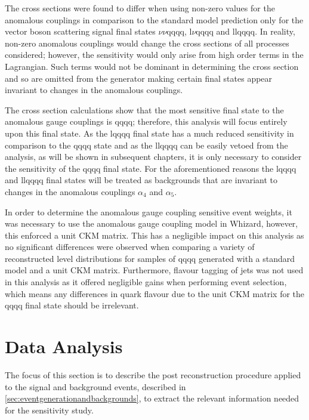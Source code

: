 The cross sections were found to differ when using non-zero values for the anomalous couplings in comparison to the standard model prediction only for the vector boson scattering signal final states $\nu\nu\text{qqqq}$, $\text{l}\nu\text{qqqq}$ and llqqqq.  In reality, non-zero anomalous couplings would change the cross sections of all processes considered; however, the sensitivity would only arise from high order terms in the Lagrangian.  Such terms would not be dominant in determining the cross section and so are omitted from the generator making certain final states appear invariant to changes in the anomalous couplings.

The cross section calculations show that the most sensitive final state to the anomalous gauge couplings is \nu{\nu}qqqq; therefore, this analysis will focus entirely upon this final state.  As the l{\nu}qqqq final state has a much reduced sensitivity in comparison to the \nu{\nu}qqqq state and as the llqqqq can be easily vetoed from the analysis, as will be shown in subsequent chapters, it is only necessary to consider the sensitivity of the \nu{\nu}qqqq final state.  For the aforementioned reasons the l{\nu}qqqq and llqqqq final states will be treated as backgrounds that are invariant to changes in the anomalous couplings $\alpha_{4}$ and $\alpha_{5}$.  

In order to determine the anomalous gauge coupling sensitive event weights, it was necessary to use the anomalous gauge coupling model in Whizard, however, this enforced a unit CKM matrix.  This has a negligible impact on this analysis as no significant differences were observed when comparing a variety of reconstructed level distributions for samples of \nu{\nu}qqqq generated with a standard model and a unit CKM matrix.  Furthermore, flavour tagging of jets was not used in this analysis as it offered negligible gains when performing event selection, which means any differences in quark flavour due to the unit CKM matrix for the \nu{\nu}qqqq final state should be irrelevant.


\section{Data Analysis}
\label{sec:dataanalysis}
The focus of this section is to describe the post reconstruction procedure applied to the signal and background events, described in \ref{sec:eventgenerationandbackgrounds}, to extract the relevant information needed for the sensitivity study. 

